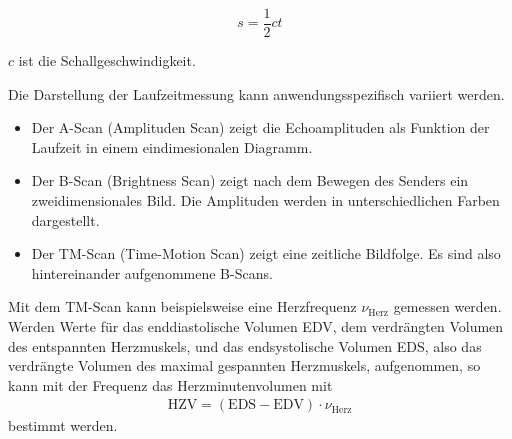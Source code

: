 \begin{equation}
  s = \frac{1}{2} c t
  \label{eqn:SchallStrecke}
\end{equation}

$c$ ist die Schallgeschwindigkeit.

Die Darstellung der Laufzeitmessung kann anwendungsspezifisch variiert werden.

\begin{itemize}
  \item Der A-Scan (Amplituden Scan) zeigt die Echoamplituden als Funktion der
  Laufzeit in einem eindimesionalen Diagramm.

  \item Der B-Scan (Brightness Scan) zeigt nach dem Bewegen des Senders ein
  zweidimensionales Bild. Die Amplituden werden in unterschiedlichen Farben dargestellt.

  \item Der TM-Scan (Time-Motion Scan) zeigt eine zeitliche Bildfolge. Es sind also hintereinander
  aufgenommene B-Scans.
\end{itemize}

Mit dem TM-Scan kann beispielsweise eine Herzfrequenz $\nu_\text{Herz}$ gemessen
werden. Werden Werte für das enddiastolische Volumen EDV, dem verdrängten
Volumen des entspannten Herzmuskels, und das endsystolische Volumen EDS, also
das verdrängte Volumen des maximal gespannten Herzmuskels, aufgenommen,
so kann mit der Frequenz das Herzminutenvolumen mit
\begin{align}
  \text{HZV} = (\text{EDS}-\text{EDV}) \cdot \nu_\text{Herz}
  \label{eqn:HZV}
\end{align}
bestimmt werden.
